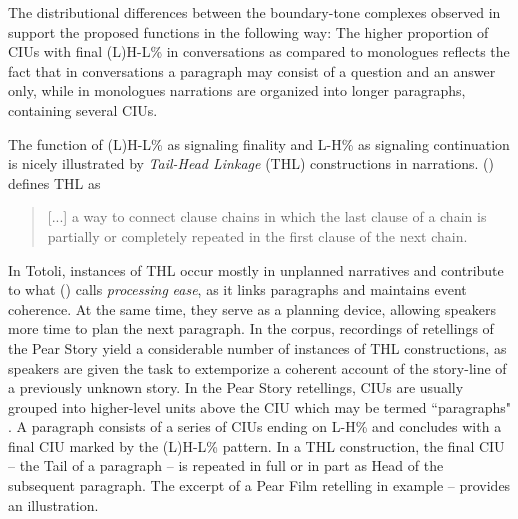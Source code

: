 The distributional differences between the boundary-tone complexes observed in  support the proposed functions in the following way: The higher proportion of CIUs with final (L)H-L\% in conversations as compared to monologues reflects the fact that in conversations a paragraph may consist of a question and an answer only, while in monologues narrations are organized into longer paragraphs, containing several CIUs.


The function of (L)H-L\% as signaling finality and L-H\% as signaling continuation  is nicely illustrated by \textit{Tail-Head Linkage} (THL)  constructions in narrations. \citeauthor{THLVries2005} (\citeyear[262]{THLVries2005}) defines THL as 

\begin{quote}
	[...] a way to connect clause chains in which the last clause of a chain is partially or completely repeated in the first clause of the next chain.
\end{quote}  


In Totoli, instances of THL occur mostly in unplanned narratives and contribute to what \citeauthor{THLVries2005} (\citeyear[378]{THLVries2005}) calls \textit{processing} \textit{ease}, as it links paragraphs and maintains event coherence. At the same time, they serve as a planning device, allowing speakers more time to plan the next paragraph. In the corpus, recordings of retellings of the Pear Story  yield a considerable number of instances of THL constructions, as speakers are given the task to extemporize a coherent account of the story-line of a previously unknown story. 
In the Pear Story retellings, CIUs are usually grouped into higher-level units above the CIU which may be termed ``paragraphs"  \citep[see][251]{himmelmann2008prosodic}. A paragraph consists of a series of CIUs ending on L-H\% and concludes with a final CIU marked by the (L)H-L\% pattern. In a THL construction, the final CIU -- the Tail of a paragraph -- is repeated in full or in part as Head of the subsequent paragraph. The excerpt of a Pear Film retelling in example -- provides an illustration.


\ea
\label{ex:THL}

